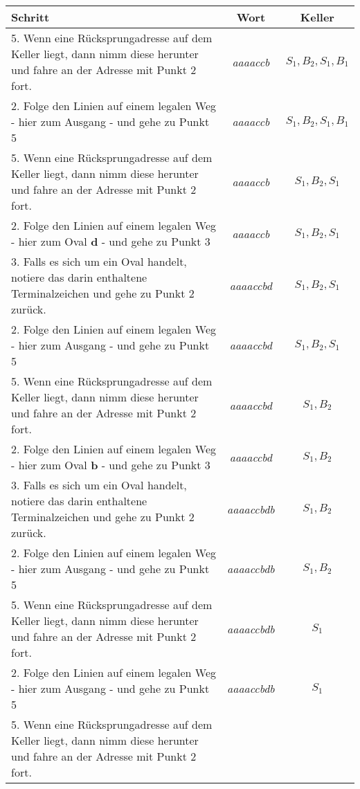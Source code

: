 \documentclass{scrreprt}
\begin{document}
\begin{enumerate}[(a)]
  \begin{small}
  \begin{tabularx}{\linewidth}{X|c|c}
    \textbf{Schritt} & \textbf{Wort} & \textbf{Keller} \\
    \hline
    5. Wenn eine Rücksprungadresse auf dem Keller liegt, dann nimm diese
    herunter und fahre an der Adresse mit Punkt 2 fort.
    & \emph{aaaaccb} & $S_1, B_2, S_1, B_1$ \\
    2. Folge den Linien auf einem legalen Weg - hier zum Ausgang - und
    gehe zu Punkt 5 & \emph{aaaaccb} & $S_1, B_2, S_1, B_1$ \\
    5. Wenn eine Rücksprungadresse auf dem Keller liegt, dann nimm diese
    herunter und fahre an der Adresse mit Punkt 2 fort.
    & \emph{aaaaccb} & $S_1, B_2, S_1$ \\
    2. Folge den Linien auf einem legalen Weg - hier zum Oval \textbf{d} - und
    gehe zu Punkt 3 & \emph{aaaaccb} & $S_1, B_2, S_1$ \\
    3. Falls es sich um ein Oval handelt, notiere das darin enthaltene
    Terminalzeichen und gehe zu Punkt 2 zurück.
    & \emph{aaaaccbd} & $S_1, B_2, S_1$ \\
    2. Folge den Linien auf einem legalen Weg - hier zum Ausgang - und
    gehe zu Punkt 5 & \emph{aaaaccbd} & $S_1, B_2, S_1$ \\
    5. Wenn eine Rücksprungadresse auf dem Keller liegt, dann nimm diese
    herunter und fahre an der Adresse mit Punkt 2 fort.
    & \emph{aaaaccbd} & $S_1, B_2$ \\
    2. Folge den Linien auf einem legalen Weg - hier zum Oval \textbf{b} - und
    gehe zu Punkt 3 & \emph{aaaaccbd} & $S_1, B_2$ \\
    3. Falls es sich um ein Oval handelt, notiere das darin enthaltene
    Terminalzeichen und gehe zu Punkt 2 zurück.
    & \emph{aaaaccbdb} & $S_1, B_2$ \\
    2. Folge den Linien auf einem legalen Weg - hier zum Ausgang - und
    gehe zu Punkt 5 & \emph{aaaaccbdb} & $S_1, B_2$ \\
    5. Wenn eine Rücksprungadresse auf dem Keller liegt, dann nimm diese
    herunter und fahre an der Adresse mit Punkt 2 fort.
    & \emph{aaaaccbdb} & $S_1$ \\
    2. Folge den Linien auf einem legalen Weg - hier zum Ausgang - und
    gehe zu Punkt 5 & \emph{aaaaccbdb} & $S_1$ \\
    5. Wenn eine Rücksprungadresse auf dem Keller liegt, dann nimm diese
    herunter und fahre an der Adresse mit Punkt 2 fort.

\end{tabularx}
\end{small}
\end{enumerate}
\end{document}
